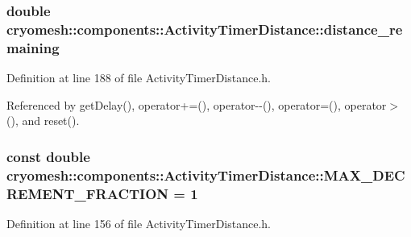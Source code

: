 \hypertarget{classcryomesh_1_1components_1_1ActivityTimerDistance_a0e793c735a10edd18fa12a019dcf8c22}{
\subsubsection[{distance\-\_\-remaining}]{\setlength{\rightskip}{0pt plus 5cm}double {\bf cryomesh\-::components\-::\-Activity\-Timer\-Distance\-::distance\-\_\-remaining}}}\label{classcryomesh_1_1components_1_1ActivityTimerDistance_a0e793c735a10edd18fa12a019dcf8c22}


\-Definition at line 188 of file \-Activity\-Timer\-Distance.\-h.



\-Referenced by get\-Delay(), operator+=(), operator-\/-\/(), operator=(), operator$>$(), and reset().

\hypertarget{classcryomesh_1_1components_1_1ActivityTimerDistance_ab24df04f889693641f609aa8f199455f}{
\subsubsection[{\-M\-A\-X\-\_\-\-D\-E\-C\-R\-E\-M\-E\-N\-T\-\_\-\-F\-R\-A\-C\-T\-I\-O\-N}]{\setlength{\rightskip}{0pt plus 5cm}const double {\bf cryomesh\-::components\-::\-Activity\-Timer\-Distance\-::\-M\-A\-X\-\_\-\-D\-E\-C\-R\-E\-M\-E\-N\-T\-\_\-\-F\-R\-A\-C\-T\-I\-O\-N} = 1}}\label{classcryomesh_1_1components_1_1ActivityTimerDistance_ab24df04f889693641f609aa8f199455f}


\-Definition at line 156 of file \-Activity\-Timer\-Distance.\-h.



